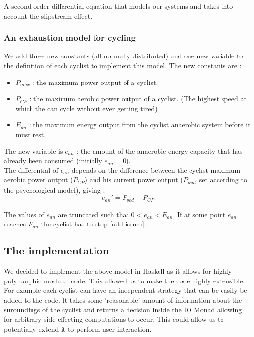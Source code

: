 \documentclass[10pt, a4paper]{report}
\begin{document}
A second order differential equation that models our systems and takes into account the slipstream effect.

\subsubsection{An exhaustion model for cycling}

We add three new constants (all normally distributed) and one new variable to the definition of each cyclist to implement this model. The new constants are :
\begin{itemize}
\item $P_{max}$ : the maximum power output of a cyclist.
\item $P_{CP}$ : the maximum aerobic power output of a cyclist. (The highest speed at which the can cycle without ever getting tired)
\item $E_{an}$ : the maximum energy output from the cyclist anaerobic system before it must rest.
\end{itemize}
The new variable is $e_{an}$ : the amount of the anaerobic energy capacity that has already been consumed (initially $e_{an} = 0$). \\

The differential of $e_{an}$ depends on the difference between the cyclist maximum aerobic power output ($P_{CP}$) and his current power output ($P_{ped}$, set according to the psychological model), giving :
$$ e_{an}' = P_{ped} - P_{CP} $$

The values of $e_{an}$ are truncated such that $0 < e_{an} < E_{an}$. If at some point $e_{an}$ reaches $E_{an}$ the cyclist has to stop [add issues].

\subsection{The implementation}\label{subsec:impl}

We decided to implement the above model in Haskell as it allows for highly polymorphic modular code. This allowed us to make the code highly extensible. For example each cyclist can have an independent strategy that can be easily be added to the code. It takes some 'reasonable' amount of information about the suroundings of the cyclist and returns a decision inside the IO Monad allowing for arbitrary side effecting computations to occur. This could allow us to potentially extend it to perform user interaction. \par
\end{document}

